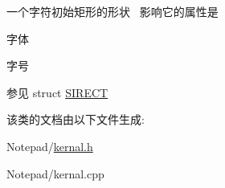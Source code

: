 一个字符初始矩形的形状~\newline
影响它的属性是~\newline



\begin{DoxyItemize}
\item 字体
\item 字号 \begin{DoxySeeAlso}{参见}
struct \hyperlink{struct_s_i_r_e_c_t}{S\+I\+R\+E\+CT} 
\end{DoxySeeAlso}

\end{DoxyItemize}

该类的文档由以下文件生成\+:\begin{DoxyCompactItemize}
\item 
Notepad/\hyperlink{kernal_8h}{kernal.\+h}\item 
Notepad/kernal.\+cpp\end{DoxyCompactItemize}
